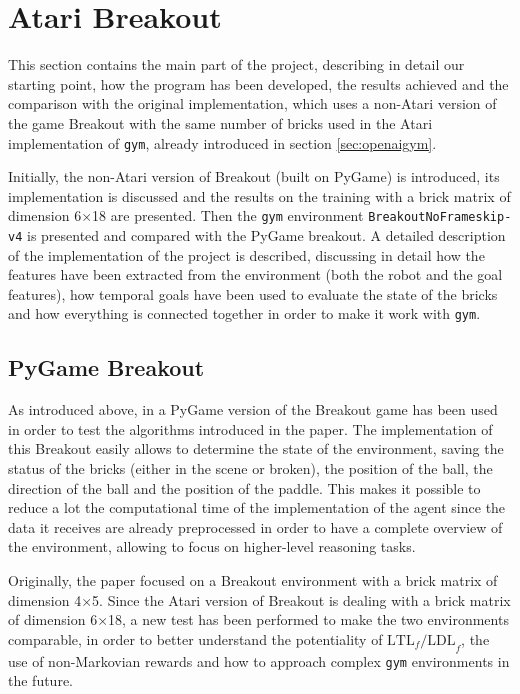 \section{Atari Breakout}
This section contains the main part of the project, describing in detail our
starting point, how the program has been developed, the results achieved and the
comparison with the original implementation, which uses a non-Atari version
of the game Breakout \cite{DBLP:journals/corr/abs-1807-06333} with the same
number of bricks used in the Atari implementation of \texttt{gym},
already introduced in section \ref{sec:openaigym}.

Initially, the non-Atari version of Breakout (built on PyGame) is introduced,
its implementation is discussed and the results on the training with a brick
matrix of dimension 6$\times$18 are presented. Then the \texttt{gym}
environment \texttt{BreakoutNoFrameskip-v4} is presented and compared with the
PyGame breakout. A detailed description of the implementation of the project
is described, discussing in detail how the features have been extracted from
the environment (both the robot and the goal features), how temporal goals
have been used to evaluate the state of the bricks and how everything is
connected together in order to make it work with \texttt{gym}.

\subsection{PyGame Breakout}
As introduced above, in \cite{DBLP:journals/corr/abs-1807-06333} a PyGame
version of the Breakout game has been used in order to test the algorithms
introduced in the paper. The implementation of this Breakout easily allows
to determine the state of the environment, saving the status of the bricks
(either in the scene or broken), the position of the ball, the direction of
the ball and the position of the paddle. This makes it possible to reduce
a lot the computational time of the implementation of the agent since the
data it receives are already preprocessed in order to have a complete
overview of the environment, allowing to focus on higher-level reasoning
tasks.

Originally, the paper focused on a Breakout environment with a brick matrix
of dimension 4$\times$5. Since the Atari version of Breakout is dealing with
a brick matrix of dimension 6$\times$18, a new test has been performed to
make the two environments comparable, in order to better understand the
potentiality of $\text{LTL}_f\text{/LDL}_f$, the use of non-Markovian rewards
and how to approach complex \texttt{gym} environments in the future.

